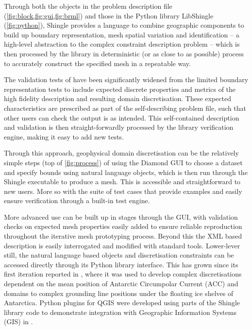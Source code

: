 \documentclass[a4paper, 10pt]{book}
\providecommand{\shingle}{Shingle\xspace}
\providecommand{\libshingle}{LibShingle\xspace}
\begin{document}
Through both the objects in the problem description file
(\cref{fig:block,fig:gui,fig:brml})
and those in the Python library \libshingle
(\cref{fig:python}),
\shingle provides a
language to combine geographic components to build up boundary representation, mesh spatial variation and identification
-- a high-level abstraction to the complex constraint description problem --
which is then processed by the library in deterministic (or as close to as possible) process to accurately construct the specified mesh
in a repeatable way.
%

The validation tests of \cite{candybrep} have been significantly widened from the limited boundary representation
tests
to include expected
discrete properties and metrics of the high fidelity description and resulting domain discretisation.
These expected characteristics are prescribed as part of the self-describing problem file, such that other users can check the output is as intended.
This self-contained description and validation is then straight-forwardly processed by the library verification engine, making it easy to add new tests.


Through this approach,
geophysical domain discretisation can be the relatively simple steps (top of \cref{fig:process}) of using the Diamond GUI to choose a dataset and specify bounds using natural language objects,
which is then run through the Shingle executable to produce a mesh.
%
This is accessible and straightforward to new users.
More so with the suite of test cases that provide examples and easily ensure verification through a built-in test engine.

More advanced use can be built up in stages through the GUI,
with validation checks on expected mesh properties easily added
to ensure reliable reproduction
throughout the iterative mesh prototyping process.
%
Beyond this the XML based description is easily interrogated and modified with standard tools.
%
Lower-lever still, the natural language based objects and discretisation constraints can be accessed directly through its Python library interface.
This has grown since its first iteration reported in \cite{candybrep},
where it was used to develop complex discretisations dependent on the mean position of
Antarctic Circumpolar Current (ACC) and domains to complex grounding line positions under the floating ice shelves of Antarctica.
%
Python plugins for QGIS \citep{qgismanual} were developed using parts of the \shingle library code to demonstrate integration with Geographic Information Systems (GIS) in \cite{candygis}.
%
\end{document}
